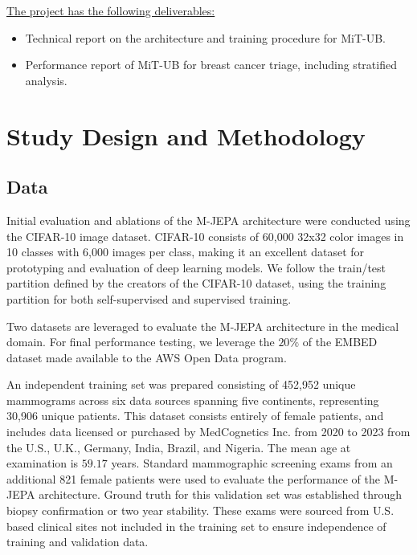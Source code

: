 \documentclass[12pt]{article}
\begin{document}
\underline{The project has the following deliverables:}
\begin{itemize}
    \item Technical report on the architecture and training procedure for MiT-UB.
    \item Performance report of MiT-UB for breast cancer triage, including stratified analysis.
\end{itemize}


\section{Study Design and Methodology}
\noindent

\subsection{Data}

Initial evaluation and ablations of the M-JEPA architecture were conducted using the CIFAR-10 \cite{krizhevsky2009learning} image dataset. 
CIFAR-10 consists of 60,000 32x32 color images in 10 classes with 6,000 images per class, making it an excellent dataset for prototyping and evaluation of deep learning models.
We follow the train/test partition defined by the creators of the CIFAR-10 dataset, using the training partition for both self-supervised and supervised training. \cite{krizhevsky2009learning}

Two datasets are leveraged to evaluate the M-JEPA architecture in the medical domain. For final performance testing, we leverage the $20\%$ of the EMBED \cite{embed2023} dataset made
available to the AWS Open Data program. 

An independent training set was prepared consisting of 452,952 unique mammograms across 
six data sources spanning five continents, representing 30,906 unique patients. This dataset consists entirely of female patients,
and includes data licensed or purchased by MedCognetics Inc. from 2020 to 2023 from the U.S., U.K., Germany, India, Brazil, and Nigeria. The mean age at examination is $59.17$ years.
Standard mammographic screening exams from an additional 821 female patients were used to evaluate the performance of the M-JEPA architecture. Ground truth for this validation set
was established through biopsy confirmation or two year stability. 
These exams were sourced from U.S. based clinical sites not included in the training set to ensure independence of training and validation data.
\end{document}
